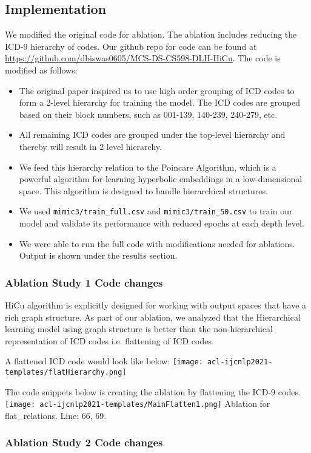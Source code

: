 \documentclass[11pt,a4paper]{article}
\begin{document}
\subsection{Implementation}
We modified the original code for ablation. The ablation includes reducing the ICD-9 hierarchy of codes. Our github repo for code can be found at \url{https://github.com/dbiswas0605/MCS-DS-CS598-DLH-HiCu}. The code is modified as follows:
\begin{itemize}
    \item The original paper inspired us to use high order grouping of ICD codes to form a 2-level hierarchy for training the model. The ICD codes are grouped based on their block numbers, such as 001-139, 140-239, 240-279, etc.
    \item All remaining ICD codes are grouped under the top-level hierarchy and thereby will result in 2 level hierarchy.
    \item We feed this hierarchy relation to the Poincare Algorithm, which is a powerful algorithm for learning hyperbolic embeddings in a low-dimensional space. This algorithm is designed to handle hierarchical structures.
    \item We used \texttt{mimic3/train\_full.csv} and \texttt{mimic3/train\_50.csv} to train our model and validate its performance with reduced epochs at each depth level.
    \item We were able to run the full code with modifications needed for ablations. Output is shown under the results section.
\end{itemize}

\subsubsection{Ablation Study 1 Code changes}
HiCu algorithm is explicitly designed for working with output spaces that have a rich graph structure. As part of our ablation, we analyzed that the Hierarchical learning model using graph structure is better than the non-hierarchical representation of ICD codes i.e. flattening of ICD codes. 

A flattened ICD code would look like below:
\texttt{[image: acl-ijcnlp2021-templates/flatHierarchy.png]}

The code snippets below is creating the ablation by flattening the ICD-9 codes.
\texttt{[image: acl-ijcnlp2021-templates/MainFlatten1.png]}
Ablation for flat\_relations. Line: 66, 69.

\subsubsection{Ablation Study 2 Code changes}
\end{document}
